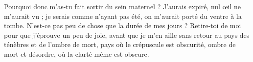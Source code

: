 \lettrine{P}{}ourquoi donc m’as-tu fait sortir du sein maternel ? J’aurais expiré, nul œil ne m’aurait vu ;
je serais comme n’ayant pas été, on m’aurait porté du ventre à la tombe.
N’est-ce pas peu de chose que la durée de mes jours ? Retire-toi de moi pour que j’éprouve un peu de joie,
avant que je m’en aille sans retour au pays des ténèbres et de l’ombre de mort,
pays où le crépuscule est obscurité, ombre de mort et désordre, où la clarté même est obscure.
